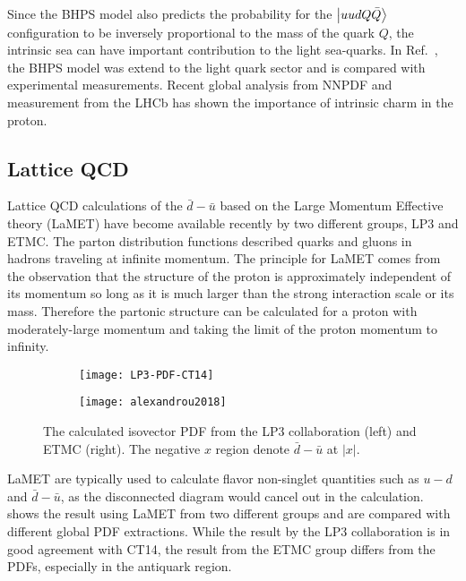 \documentclass[../main.tex]{subfiles}
\begin{document}
Since the BHPS model also predicts the probability for the $\ket{uudQ\bar{Q}}$ configuration to
be inversely proportional to the mass of the quark $Q$, the intrinsic sea can have important
contribution to the light sea-quarks. In Ref.~\cite{chang2011,chang2011a}, the BHPS model
was extend to the light quark sector and is compared with experimental measurements.
Recent global analysis from NNPDF \cite{ball2022} and measurement from the LHCb \cite{aaij2022}
has shown the importance of intrinsic charm in the proton.



\subsection{Lattice QCD}
Lattice QCD calculations of the $\bar{d} - \bar{u}$ based on the Large Momentum Effective
theory (LaMET) \cite{ji2021,constantinou2021} have become available recently by two different groups,
LP3\cite{chen2018} and ETMC\cite{alexandrou2018}.
The parton distribution functions described quarks and gluons in hadrons traveling at infinite
momentum. The principle for LaMET comes from the observation that the structure of the proton is
approximately independent of its momentum so long as it is much larger than the strong interaction
scale or its mass. Therefore the partonic structure can be calculated for a proton with
moderately-large momentum and taking the limit of the proton momentum to infinity.

\begin{figure}[h!]
	\centering
	\begin{subfigure}{0.45\linewidth}
		\texttt{[image: LP3-PDF-CT14]}
	\end{subfigure}
	\begin{subfigure}{0.45\linewidth}
		\texttt{[image: alexandrou2018]}
	\end{subfigure}
	\caption{The calculated isovector PDF from the LP3 collaboration (left)
		\cite{chen2018} and ETMC (right)\cite{alexandrou2018}.
		The negative $x$ region denote $\bar{d}-\bar{u}$ at $\left|x\right|$.}
	\label{fig:lamet}
\end{figure}
LaMET are typically used to calculate flavor non-singlet quantities such as $u-d$ and $\bar{d}-\bar{u}$,
as the disconnected diagram would cancel out in the calculation.
 shows the result using LaMET from two different groups and are compared with
different global PDF extractions. While the result by the LP3 collaboration
is in good agreement with CT14, the result from the ETMC group differs from the PDFs,
especially in the antiquark region.
\end{document}
